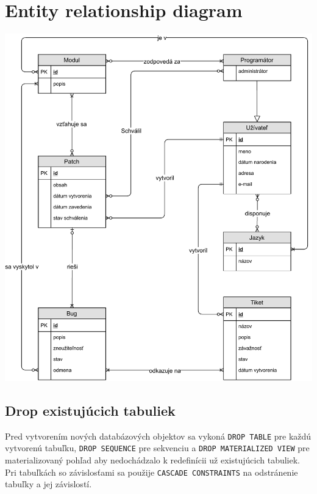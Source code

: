 \documentclass[11pt, a4paper]{article}
\begin{document}
    \section{Entity relationship diagram}
    \label{sec:entity-relationship-diagram}
    \begin{center}
        \vspace*{\fill}
        \includegraphics[width=0.95\linewidth]{ER_diagram.pdf}
        \vspace*{\fill}
    \end{center}

    \newpage

    \subsection{Drop existujúcich tabuliek}\label{subsec:drop-existujúcich-tabuliek}

    Pred vytvorením nových databázových objektov sa vykoná \texttt{DROP TABLE} pre každú vytvorenú tabuľku, \texttt{DROP SEQUENCE} pre sekvenciu a \texttt{DROP MATERIALIZED VIEW} pre materializovaný pohľad aby nedochádzalo k redefinícii už existujúcich tabuliek.
    Pri tabuľkách so závislosťami sa použije \texttt{CASCADE CONSTRAINTS} na odstránenie tabuľky a jej závislostí.
\end{document}
